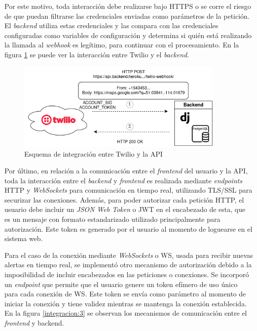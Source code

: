Por este motivo, toda interacción debe realizarse bajo HTTPS o se corre el riesgo de que puedan filtrarse las credenciales enviadas como parámetros de la petición. El \textit{backend} utiliza estas credenciales y las compara con las credenciales configuradas como variables de configuración y determina si quién está realizando la llamada al \textit{webhook} es legítimo, para continuar con el procesamiento. En la figura \ref{integracion:2} se puede ver la interacción entre Twilio y el \textit{backend}.

\begin{figure}[H]
	\centering
	\includegraphics[width=0.9\textwidth]{./Figures/integracion-2.png}
	\caption{Esquema de integración entre Twilio y la API}
	\label{integracion:2}
\end{figure}


Por último, en relación a la comunicación entre el \textit{frontend} del usuario y la API, toda la interacción entre el \textit{backend} y \textit{frontend} es realizada mediante \textit{endpoints} HTTP y \textit{WebSockets} para comunicación en tiempo real, utilizando TLS/SSL para securizar las conexiones. Además, para poder autorizar cada petición HTTP, el usuario debe incluir un \textit{JSON Web Token} o JWT en el encabezado de esta, que es un mensaje con formato estandarizado utilizado principalmente para autorización\citep{JWT:1}. Este token es generado por el usuario al momento de loguearse en el sistema web.

Para el caso de la conexión mediante \textit{WebSockets} o WS, usada para recibir nuevas alertas en tiempo real, se implementó otro mecanismo de autorización debido a la imposibilidad de incluir encabezados en las peticiones o conexiones. Se incorporó un \textit{endpoint} que permite que el usuario genere un token efímero de uso único para cada conexión de WS. Este token se envía como parámetro al momento de iniciar la conexión y tiene validez mientras se mantenga la conexión establecida. En la figura \ref{integracion:3} se observan los mecanismos de comunicación entre el \textit{frontend} y backend.

